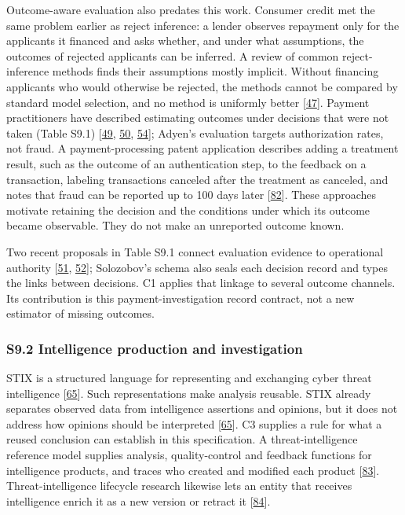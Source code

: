 \documentclass[
  11pt,
]{article}
\begin{document}
Outcome-aware evaluation also predates this work. Consumer credit met
the same problem earlier as reject inference: a lender observes
repayment only for the applicants it financed and asks whether, and
under what assumptions, the outcomes of rejected applicants can be
inferred. A review of common reject-inference methods finds their
assumptions mostly implicit. Without financing applicants who would
otherwise be rejected, the methods cannot be compared by standard model
selection, and no method is uniformly better
{[}\protect\hyperlink{ref-Ehrhardt2021RejectInference}{47}{]}. Payment
practitioners have described estimating outcomes under decisions that
were not taken (Table S9.1)
{[}\protect\hyperlink{ref-Egg2025AdyenOPE}{49},
\protect\hyperlink{ref-Tocker2022VirtualControl}{50},
\protect\hyperlink{ref-Manapat2015Counterfactual}{54}{]}; Adyen's
evaluation targets authorization rates, not fraud. A payment-processing
patent application describes adding a treatment result, such as the
outcome of an authentication step, to the feedback on a transaction,
labeling transactions canceled after the treatment as canceled, and
notes that fraud can be reported up to 100 days later
{[}\protect\hyperlink{ref-Erdbrink2023TreatmentPatent}{82}{]}. These
approaches motivate retaining the decision and the conditions under
which its outcome became observable. They do not make an unreported
outcome known.

Two recent proposals in Table S9.1 connect evaluation evidence to
operational authority {[}\protect\hyperlink{ref-Deng2026FCAC}{51},
\protect\hyperlink{ref-Solozobov2026DecisionTrace}{52}{]}; Solozobov's
schema also seals each decision record and types the links between
decisions. C1 applies that linkage to several outcome channels. Its
contribution is this payment-investigation record contract, not a new
estimator of missing outcomes.

\hypertarget{s9.2-intelligence-production-and-investigation}{%
\subsubsection{S9.2 Intelligence production and
investigation}\label{s9.2-intelligence-production-and-investigation}}

STIX is a structured language for representing and exchanging cyber
threat intelligence {[}\protect\hyperlink{ref-OASIS2021STIX}{65}{]}.
Such representations make analysis reusable. STIX already separates
observed data from intelligence assertions and opinions, but it does not
address how opinions should be interpreted
{[}\protect\hyperlink{ref-OASIS2021STIX}{65}{]}. C3 supplies a rule for
what a reused conclusion can establish in this specification. A
threat-intelligence reference model supplies analysis, quality-control
and feedback functions for intelligence products, and traces who created
and modified each product
{[}\protect\hyperlink{ref-Sakellariou2022CTIReferenceModel}{83}{]}.
Threat-intelligence lifecycle research likewise lets an entity that
receives intelligence enrich it as a new version or retract it
{[}\protect\hyperlink{ref-Dimitriadis2025}{84}{]}.
\end{document}
